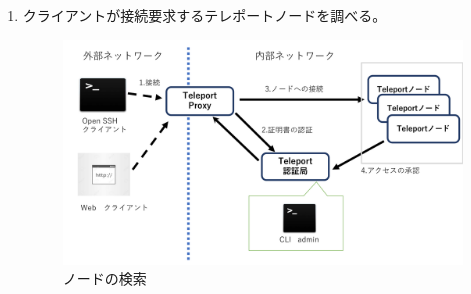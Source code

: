 \documentclass[11pt,a4j,titlepage]{jreport}
\begin{document}
\begin{enumerate}[1:]
    
    \item クライアントが接続要求するテレポートノードを調べる。\mbox{}\\
    \begin{figure}[tbp]
        \centering
        \includegraphics*[width=1.0\textwidth,page=4]{graphs/teleport_archtecture.pdf}
        \caption{ノードの検索}
        \label{search_node}
    \end{figure}


\end{enumerate}
\end{document}
